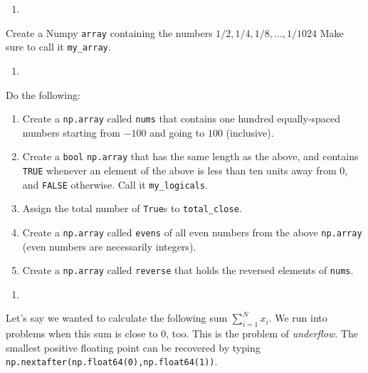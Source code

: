 \documentclass[12pt,krantz2]{krantz}
\providecommand{\tightlist}{%
  \setlength{\itemsep}{0pt}\setlength{\parskip}{0pt}}
\begin{document}
\begin{enumerate}
\def\labelenumi{\arabic{enumi}.}
\setcounter{enumi}{1}
\item
\end{enumerate}

Create a Numpy \texttt{array} containing the numbers \(1/2, 1/4, 1/8, \ldots, 1/1024\) Make sure to call it \texttt{my\_array}.

\begin{enumerate}
\def\labelenumi{\arabic{enumi}.}
\setcounter{enumi}{2}
\item
\end{enumerate}

Do the following:

\begin{enumerate}
\def\labelenumi{\alph{enumi})}
\tightlist
\item
  Create a \texttt{np.array} called \texttt{nums} that contains one hundred equally-spaced numbers starting from \(-100\) and going to \(100\) (inclusive).
\item
  Create a \texttt{bool} \texttt{np.array} that has the same length as the above, and contains \texttt{TRUE} whenever an element of the above is less than ten units away from \(0\), and \texttt{FALSE} otherwise. Call it \texttt{my\_logicals}.
\item
  Assign the total number of \texttt{True}s to \texttt{total\_close}.
\item
  Create a \texttt{np.array} called \texttt{evens} of all even numbers from the above \texttt{np.array} (even numbers are necessarily integers).
\item
  Create a \texttt{np.array} called \texttt{reverse} that holds the reversed elements of \texttt{nums}.
\end{enumerate}

\begin{enumerate}
\def\labelenumi{\arabic{enumi}.}
\setcounter{enumi}{3}
\item
\end{enumerate}

Let's say we wanted to calculate the following sum \(\sum_{i=1}^N x_i\). We run into problems when this sum is close to \(0\), too. This is the problem of \emph{underflow}. The smallest positive floating point can be recovered by typing \texttt{np.nextafter(np.float64(0),np.float64(1))}.
\end{document}
